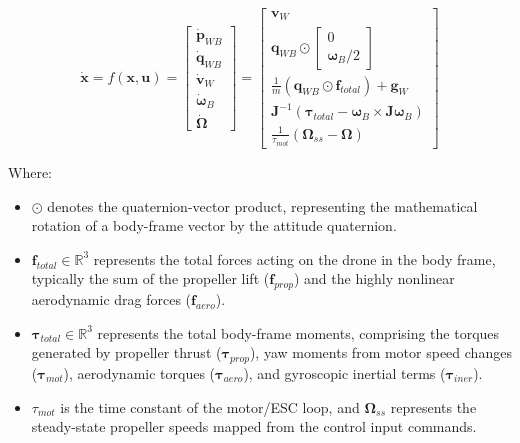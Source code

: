 \documentclass{article}
\begin{document}
\begin{equation}
    \dot{\mathbf{x}} = f(\mathbf{x}, \mathbf{u}) = 
    \begin{bmatrix} 
    \dot{\mathbf{p}}_{WB} \\ 
    \dot{\mathbf{q}}_{WB} \\ 
    \dot{\mathbf{v}}_W \\ 
    \dot{\boldsymbol{\omega}}_B \\ 
    \dot{\boldsymbol{\Omega}} 
    \end{bmatrix} 
    =
    \begin{bmatrix} 
    \mathbf{v}_W \\ 
    \mathbf{q}_{WB} \odot \begin{bmatrix} 0 \\ \boldsymbol{\omega}_B / 2 \end{bmatrix} \\ 
    \frac{1}{m} \left( \mathbf{q}_{WB} \odot \mathbf{f}_{total} \right) + \mathbf{g}_W \\ 
    \mathbf{J}^{-1} \left( \boldsymbol{\tau}_{total} - \boldsymbol{\omega}_B \times \mathbf{J}\boldsymbol{\omega}_B \right) \\ 
    \frac{1}{\tau_{mot}} (\boldsymbol{\Omega}_{ss} - \boldsymbol{\Omega})
    \end{bmatrix}
\end{equation}

Where:
\begin{itemize}
    \item $\odot$ denotes the quaternion-vector product, representing the mathematical rotation of a body-frame vector by the attitude quaternion. 
    \item $\mathbf{f}_{total} \in \mathbb{R}^3$ represents the total forces acting on the drone in the body frame, typically the sum of the propeller lift ($\mathbf{f}_{prop}$) and the highly nonlinear aerodynamic drag forces ($\mathbf{f}_{aero}$).
    \item $\boldsymbol{\tau}_{total} \in \mathbb{R}^3$ represents the total body-frame moments, comprising the torques generated by propeller thrust ($\boldsymbol{\tau}_{prop}$), yaw moments from motor speed changes ($\boldsymbol{\tau}_{mot}$), aerodynamic torques ($\boldsymbol{\tau}_{aero}$), and gyroscopic inertial terms ($\boldsymbol{\tau}_{iner}$).
    \item $\tau_{mot}$ is the time constant of the motor/ESC loop, and $\boldsymbol{\Omega}_{ss}$ represents the steady-state propeller speeds mapped from the control input commands.
\end{itemize}
\end{document}
